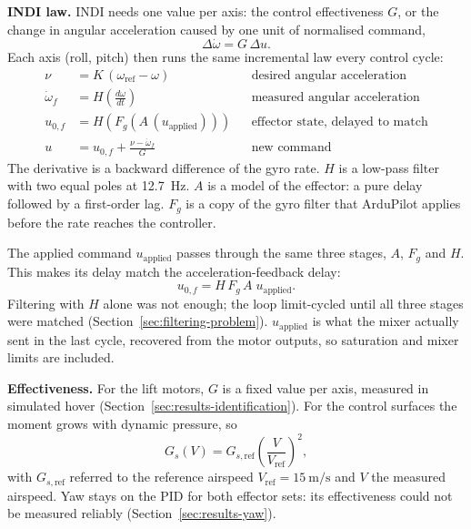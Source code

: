 \documentclass{article}
\begin{document}
\textbf{INDI law.} INDI needs one value per axis: the control effectiveness $G$, or the change in angular acceleration caused by one unit of normalised command,
\begin{equation}
    \Delta\dot\omega = G\,\Delta u .
    \label{eq:effectiveness}
\end{equation}
Each axis (roll, pitch) then runs the same incremental law every control cycle:
\begin{align}
    \nu &= K\,(\omega_{\mathrm{ref}}-\omega) && \text{desired angular acceleration} \nonumber\\
    \dot\omega_f &= H\!\left(\tfrac{d\omega}{dt}\right) && \text{measured angular acceleration} \nonumber\\
    u_{0,f} &= H\!\left(F_g\!\left(A\,(u_{\mathrm{applied}})\right)\right) && \text{effector state, delayed to match} \nonumber\\
    u &= u_{0,f} + \frac{\nu-\dot\omega_f}{G} && \text{new command}
    \label{eq:diagonal-inversion}
\end{align}
The derivative is a backward difference of the gyro rate. $H$ is a low-pass filter with two equal poles at \SI{12.7}{\hertz}. $A$ is a model of the effector: a pure delay followed by a first-order lag. $F_g$ is a copy of the gyro filter that ArduPilot applies before the rate reaches the controller.

The applied command $u_{\mathrm{applied}}$ passes through the same three stages, $A$, $F_g$ and $H$. This makes its delay match the acceleration-feedback delay:
\begin{equation}
    u_{0,f} = H\,F_g\,A\;u_{\mathrm{applied}} .
    \label{eq:sync-fix}
\end{equation}
Filtering with $H$ alone was not enough; the loop limit-cycled until all three stages were matched (Section~\ref{sec:filtering-problem}). $u_{\mathrm{applied}}$ is what the mixer actually sent in the last cycle, recovered from the motor outputs, so saturation and mixer limits are included.

\textbf{Effectiveness.} For the lift motors, $G$ is a fixed value per axis, measured in simulated hover (Section~\ref{sec:results-identification}). For the control surfaces the moment grows with dynamic pressure, so
\begin{equation}
    G_s(V) = G_{s,\mathrm{ref}}\left(\frac{V}{V_{\mathrm{ref}}}\right)^{2},
    \label{eq:fw-indi-scaling}
\end{equation}
with $G_{s,\mathrm{ref}}$ referred to the reference airspeed $V_{\mathrm{ref}}=\SI{15}{\meter\per\second}$ and $V$ the measured airspeed. Yaw stays on the PID for both effector sets: its effectiveness could not be measured reliably (Section~\ref{sec:results-yaw}).
\end{document}
